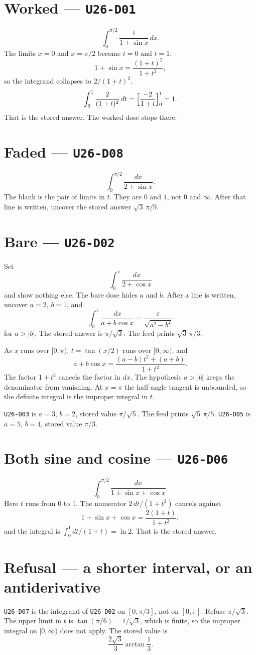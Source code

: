\section{Worked --- \texttt{U26-D01}}
\[
\int_0^{\pi/2}\frac{1}{1+\sin x}\,dx.
\]
The limits $x=0$ and $x=\pi/2$ become $t=0$ and $t=1$.
\[
1+\sin x=\frac{(1+t)^2}{1+t^2},
\]
so the integrand collapses to $2/(1+t)^2$.
\[
\int_0^1\frac{2}{(1+t)^2}\,dt=\Bigl[\frac{-2}{1+t}\Bigr]_0^1=1.
\]
That is the stored answer. The worked dose stops there.

\section{Faded --- \texttt{U26-D08}}
\[
\int_0^{\pi/2}\frac{dx}{2+\sin x}.
\]
The blank is the pair of limits in $t$. They are $0$ and $1$, not $0$ and $\infty$. After that line is written, uncover the stored answer $\sqrt{3}\,\pi/9$.

\section{Bare --- \texttt{U26-D02}}
Set
\[
\int_0^{\pi}\frac{dx}{2+\cos x}
\]
and show nothing else. The bare dose hides $a$ and $b$. After a line is written, uncover $a=2$, $b=1$, and
\[
\int_0^{\pi}\frac{dx}{a+b\cos x}=\frac{\pi}{\sqrt{a^2-b^2}}
\]
for $a>|b|$. The stored answer is $\pi/\sqrt{3}$. The feed prints $\sqrt{3}\,\pi/3$.

As $x$ runs over $[0,\pi)$, $t=\tan(x/2)$ runs over $[0,\infty)$, and
\[
a+b\cos x=\frac{(a-b)t^2+(a+b)}{1+t^2}.
\]
The factor $1+t^2$ cancels the factor in $dx$. The hypothesis $a>|b|$ keeps the denominator from vanishing. At $x=\pi$ the half-angle tangent is unbounded, so the definite integral is the improper integral in $t$.

\texttt{U26-D03} is $a=3$, $b=2$, stored value $\pi/\sqrt{5}$. The feed prints $\sqrt{5}\,\pi/5$. \texttt{U26-D05} is $a=5$, $b=4$, stored value $\pi/3$.

\section{Both sine and cosine --- \texttt{U26-D06}}
\[
\int_0^{\pi/2}\frac{dx}{1+\sin x+\cos x}.
\]
Here $t$ runs from 0 to 1. The numerator $2\,dt/(1+t^2)$ cancels against
\[
1+\sin x+\cos x=\frac{2(1+t)}{1+t^2},
\]
and the integral is $\int_0^1 dt/(1+t)=\ln 2$. That is the stored answer.

\section{Refusal --- a shorter interval, or an antiderivative}
\texttt{U26-D07} is the integrand of \texttt{U26-D02} on $[0,\pi/3]$, not on $[0,\pi]$. Refuse $\pi/\sqrt{3}$. The upper limit in $t$ is $\tan(\pi/6)=1/\sqrt{3}$, which is finite, so the improper integral on $[0,\infty)$ does not apply. The stored value is
\[
\frac{2\sqrt{3}}{3}\arctan\frac{1}{3}.
\]

